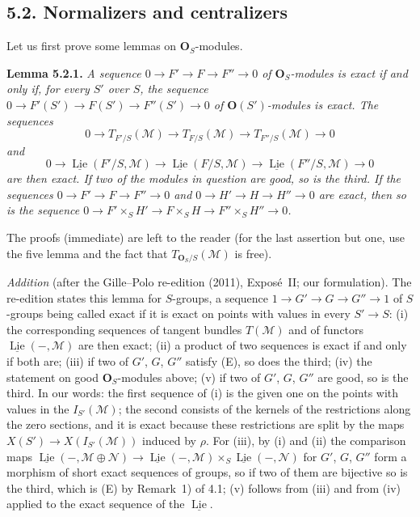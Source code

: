 \subsection*{5.2. Normalizers and centralizers}

Let us first prove some lemmas on \(\mathbf O_S\)-modules.

\medskip
\noindent{}\textbf{Lemma 5.2.1.}
\textit{A sequence \(0\to F'\to F\to F''\to0\) of \(\mathbf O_S\)-modules
is exact if and only if, for every \(S'\) over \(S\), the sequence
\(0\to F'(S')\to F(S')\to F''(S')\to0\) of \(\mathbf O(S')\)-modules is
exact. The sequences}
\[
 0\longrightarrow T_{F'/S}(\mathscr M)\longrightarrow T_{F/S}(\mathscr M)
 \longrightarrow T_{F''/S}(\mathscr M)\longrightarrow0
\]
\textit{and}
\[
 0\longrightarrow\underline{\operatorname{Lie}}(F'/S,\mathscr M)
 \longrightarrow\underline{\operatorname{Lie}}(F/S,\mathscr M)
 \longrightarrow\underline{\operatorname{Lie}}(F''/S,\mathscr M)
 \longrightarrow0
\]
\textit{are then exact. If two of the modules in question are good, so is
the third. If the sequences \(0\to F'\to F\to F''\to0\) and
\(0\to H'\to H\to H''\to0\) are exact, then so is the sequence
\(0\to F'\times_SH'\to F\times_SH\to F''\times_SH''\to0\).}

The proofs (immediate) are left to the reader (for the last assertion
but one, use the five lemma and the fact that
\(T_{\mathbf O_S/S}(\mathscr M)\) is free).

\par\medskip\noindent
\emph{Addition} (after the Gille--Polo re-edition (2011), Expos\'e~II; our
formulation). The re-edition states this lemma for \(S\)-groups, a
sequence \(1\to G'\to G\to G''\to1\) of \(S\)-groups being called exact
if it is exact on points with values in every \(S'\to S\): (i) the
corresponding sequences of tangent bundles \(T(\mathscr M)\) and of
functors \(\underline{\operatorname{Lie}}(-,\mathscr M)\) are then exact;
(ii) a product of two sequences is exact if and only if both are; (iii)
if two of \(G'\), \(G\), \(G''\) satisfy (E), so does the third; (iv) the
statement on good \(\mathbf O_S\)-modules above; (v) if two of
\(G'\), \(G\), \(G''\) are good, so is the third. In our words: the first
sequence of (i) is the given one on the points with values in the
\(I_{S'}(\mathscr M)\); the second consists of the kernels of the
restrictions along the zero sections, and it is exact because these
restrictions are split by the maps \(X(S')\to X(I_{S'}(\mathscr M))\)
induced by \(\rho\). For (iii), by (i) and (ii) the comparison maps
\(\underline{\operatorname{Lie}}(-,\mathscr M\oplus\mathscr N)\to
\underline{\operatorname{Lie}}(-,\mathscr M)\times_S
\underline{\operatorname{Lie}}(-,\mathscr N)\) for \(G'\), \(G\), \(G''\)
form a morphism of short exact sequences of groups, so if two of them are
bijective so is the third, which is (E) by Remark~1) of 4.1; (v) follows
from (iii) and from (iv) applied to the exact sequence of the
\(\underline{\operatorname{Lie}}\).
\par\medskip

